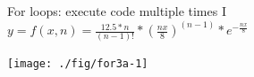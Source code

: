 \documentclass[xcolor=table,       handout,    xcolor=dvipsnames]{beamer}\usepackage[]{graphicx}\usepackage[]{color}
\newenvironment{knitrout}{}{} %
\begin{document}

\begin{frame}[fragile]{For loops: execute code multiple times I}
\hspace{5em} $y = f(x, n) = \frac{12.5*n}{(n-1)!}*(\frac{n x}{8})^{(n-1)}*e^{-\frac{n x}{8}}$
\begin{knitrout}\footnotesize
{}\color{fgcolor}

{\centering \texttt{[image: ./fig/for3a-1]} 

}



\end{knitrout}

\end{frame}

\end{document}
